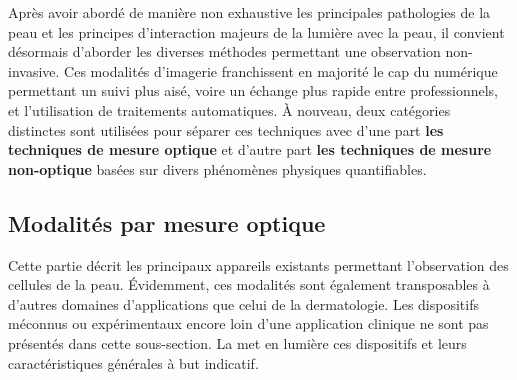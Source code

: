 Après avoir abordé de manière non exhaustive les principales pathologies de la peau et les principes d'interaction majeurs de la lumière avec la peau, il convient désormais d'aborder les diverses méthodes permettant une observation non-invasive. Ces modalités d'imagerie franchissent en majorité le cap du numérique permettant un suivi plus aisé, voire un échange plus rapide entre professionnels, et l’utilisation de traitements automatiques. À nouveau, deux catégories distinctes sont utilisées pour séparer ces techniques avec d’une part \textbf{les techniques de mesure optique} et d'autre part \textbf{les techniques de mesure non-optique} basées sur divers phénomènes physiques quantifiables.\par

\subsection{Modalités par mesure optique}
Cette partie décrit les principaux appareils existants permettant l'observation des cellules de la peau. Évidemment, ces modalités sont également transposables à d'autres domaines d'applications que celui de la dermatologie. Les dispositifs méconnus ou expérimentaux encore loin d'une application clinique ne sont pas présentés dans cette sous-section. La  met en lumière ces dispositifs et leurs caractéristiques générales à but indicatif.\par

